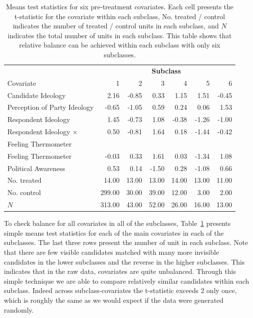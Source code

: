 \documentclass[11pt,titlepage]{article}
\newcommand{\MC}{\multicolumn}
\begin{document}
\begin{table}[t]
  \begin{center}
    \begin{tabular}{lrrrrrr}
      \hline
      & \MC{6}{c}{\bf Subclass} \\
      Covariate &  1 &  2 &  3 &  4 &  5 &  6 \\
      \hline
      Candidate Ideology & 2.16 & -0.85 & 0.33 & 1.15 & 1.51 & -0.45 \\
      Perception of Party Ideology & -0.65 & -1.05 & 0.59 & 0.24 & 0.06 & 1.53 \\
      Respondent Ideology & 1.45 & -0.73 & 1.08 & -0.38 & -1.26 & -1.00 \\
      Respondent Ideology $\times$ & 0.50 & -0.81 & 1.64 & 0.18 &
      -1.44 & -0.42 \\
      \hspace{0.1in} Feeling Thermometer \\
      Feeling Thermometer & -0.03 & 0.33 & 1.61 & 0.03 & -1.34 & 1.08 \\
      Political Awareness & 0.53 & 0.14 & -1.50 & 0.28 & -1.08 & 0.66 \\
      No. treated & 14.00 & 13.00 & 13.00 & 14.00 & 13.00 & 11.00 \\
      No. control & 299.00 & 30.00 & 39.00 & 12.00 & 3.00 & 2.00 \\
      $N$ & 313.00 & 43.00 & 52.00 & 26.00 & 16.00 & 13.00 \\
      \hline
    \end{tabular}
    \caption{Means test statistics for six pre-treatment covariates.
      Each cell presents the t-statistic for the covariate within each
      subclass, No. treated / control indicates the number of
      treated / control units in each subclass, and $N$ indicates the
      total number of units in each subclass.  This table shows that
      relative balance can be achieved within each subclass with only
      six subclasses.}
    \label{tb:kochxsub}
  \end{center}
\end{table}

To check balance for all covariates in all of the subclasses,
Table~\ref{tb:kochxsub} presents simple means test statistics for each
of the main covariates in each of the subclasses.  The last three rows
present the number of unit in each subclass.  Note that there are few
visible candidates matched with many more invisible candidates in the
lower subclasses and the reverse in the higher subclasses.  This
indicates that in the raw data, covariates are quite unbalanced.
Through this simple technique we are able to compare relatively
similar candidates within each subclass.  Indeed across
subclass-covariates the t-statistic exceeds 2 only once, which is
roughly the same as we would expect if the data were generated
randomly.
\end{document}
